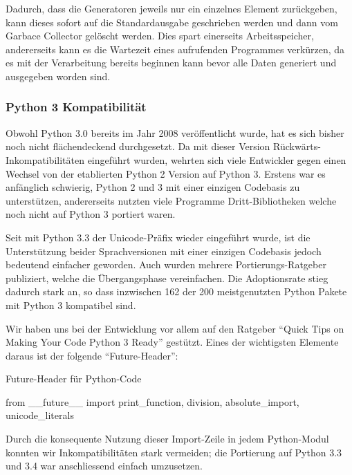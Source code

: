 
Dadurch, dass die Generatoren jeweils nur ein einzelnes Element zurückgeben,
kann dieses sofort auf die Standardausgabe geschrieben werden und dann vom
Garbace Collector gelöscht werden. Dies spart einerseits Arbeitsspeicher,
andererseits kann es die Wartezeit eines aufrufenden Programmes verkürzen, da es
mit der Verarbeitung bereits beginnen kann bevor alle Daten generiert und
ausgegeben worden sind.

\subsubsection{Python 3 Kompatibilität}

Obwohl Python 3.0 bereits im Jahr 2008 veröffentlicht wurde, hat es sich bisher
noch nicht flächendeckend durchgesetzt. Da mit dieser Version
Rückwärts-Inkompatibilitäten eingeführt wurden, wehrten sich viele Entwickler
gegen einen Wechsel von der etablierten Python 2 Version auf Python 3. Erstens
war es anfänglich schwierig, Python 2 und 3 mit einer einzigen Codebasis zu
unterstützen, andererseits nutzten viele Programme Dritt-Bibliotheken welche
noch nicht auf Python 3 portiert waren.

Seit mit Python 3.3 der Unicode-Präfix wieder eingeführt
wurde\cite{PEP414:2012}, ist die Unterstützung beider Sprachversionen mit einer
einzigen Codebasis jedoch bedeutend einfacher geworden. Auch wurden mehrere
Portierungs-Ratgeber publiziert, welche die Übergangsphase
vereinfachen\cite{regebro2013porting, ronacher2013porting}. Die Adoptionsrate
stieg dadurch stark an, so dass inzwischen 162 der 200 meistgenutzten Python
Pakete mit Python 3 kompatibel sind\cite{py3adoption}.

Wir haben uns bei der Entwicklung vor allem auf den Ratgeber \enquote{Quick Tips
on Making Your Code Python 3 Ready}\cite{deshev2012porting} gestützt. Eines der
wichtigsten Elemente daraus ist der folgende \enquote{Future-Header}:

\begin{listing}[H]
\caption{Future-Header für Python-Code}
\begin{pythoncode}
from __future__ import print_function, division, absolute_import, unicode_literals
\end{pythoncode}
\end{listing}

Durch die konsequente Nutzung dieser Import-Zeile in jedem Python-Modul konnten
wir Inkompatibilitäten stark vermeiden; die Portierung auf Python 3.3 und 3.4
war anschliessend einfach umzusetzen.

